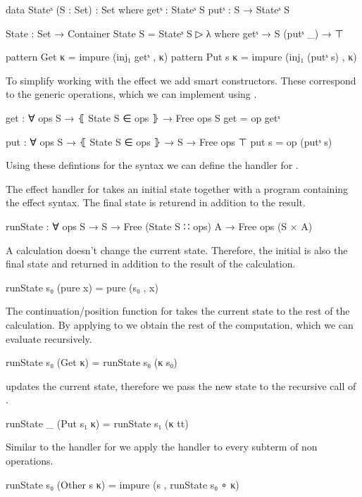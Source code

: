 \begin{code}
data Stateˢ (S : Set) : Set where
  getˢ : Stateˢ S
  putˢ : S → Stateˢ S

State : Set → Container
State S = Stateˢ S ▷ λ where
  getˢ      → S
  (putˢ _)  → ⊤

pattern Get κ    = impure (inj₁ getˢ , κ)
pattern Put s κ  = impure (inj₁ (putˢ s) , κ)
\end{code}
To simplify working with the  effect we add smart
constructors.
These correspond to the generic operations, which we can implement using
.

\begin{code}
get : ∀ {ops S} → ⦃ State S ∈ ops ⦄ → Free ops S
get = op getˢ

put : ∀ {ops S} → ⦃ State S ∈ ops ⦄ → S → Free ops ⊤
put s = op (putˢ s)
\end{code}
Using these defintions for the syntax we can define the handler for
.

\begin{AgdaAlign}
The effect handler for  takes an initial state together
with a program containing the effect syntax.
The final state is returend in addition to the result.

\begin{code}
runState : ∀ {ops S} → S → Free (State S ∷ ops) A → Free ops (S × A)
\end{code}
A  calculation doesn't change the current state.
Therefore, the initial is also the final state and returned in addition to the
result of the calculation.
\begin{code}
runState s₀ (pure x)     = pure (s₀ , x)
\end{code}
The continuation/position function for  takes the current
state to the rest of the calculation.
By applying  to  we obtain the rest of the
computation, which we can evaluate recursively.
\begin{code}
runState s₀ (Get κ)      = runState s₀ (κ s₀)
\end{code}
 updates the current state, therefore we pass the new state
 to the recursive call of .
\begin{code}
runState _  (Put s₁ κ)   = runState s₁ (κ tt)
\end{code}
Similar to the handler for  we apply the handler to every
subterm of non  operations.
\begin{code}
runState s₀ (Other s κ)  = impure (s , runState s₀ ∘ κ)
\end{code}
\end{AgdaAlign}

